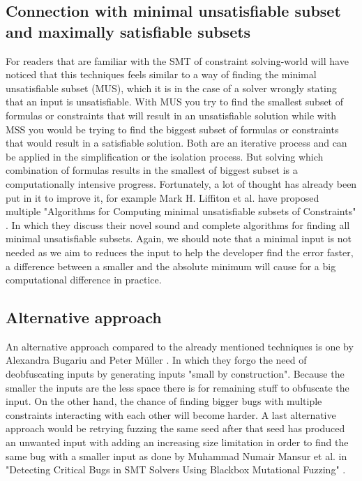 \subsection{Connection with minimal unsatisfiable subset and maximally satisfiable subsets}
\label{inputReduction:MUS/MSS}
For readers that are familiar with the SMT of constraint solving-world will have noticed that this techniques feels similar to a way of finding the minimal unsatisfiable subset (MUS), which it is in the case of a solver wrongly stating that an input is unsatisfiable. 
With MUS you try to find the smallest subset of formulas or constraints that will result in an unsatisfiable solution while with 
MSS you would be trying to find the biggest subset of formulas or constraints that would result in a satisfiable solution. Both are an iterative process and can be applied in the simplification or the isolation process. But solving which combination of formulas results in the smallest of biggest subset is a computationally intensive progress. Fortunately, a lot of thought has already been put in it to improve it, for example Mark H. Liffiton et al. have proposed multiple "Algorithms for Computing minimal unsatisfiable subsets of Constraints" \cite{51liffiton2008algorithms}. In which they discuss their novel sound and complete algorithms for finding all minimal unsatisfiable subsets. Again, we should note that a minimal input is not needed as we aim to reduces the input to help the developer find the error faster, a difference between a smaller and the absolute minimum will cause for a big computational difference in practice.

\subsection{Alternative approach}
\label{inputReduction:alt2deobfuscating}
An alternative approach compared to the already mentioned techniques is one by Alexandra Bugariu and Peter M\"uller \cite{9bugariu2020automaticallyTestingStringSolvers}. In which they forgo the need of deobfuscating inputs by generating inputs "small by construction". 
Because the smaller the inputs are the less space there is for remaining stuff to obfuscate the input. On the other hand, the chance of finding bigger bugs with multiple constraints interacting with each other will become harder.
A last alternative approach would be retrying fuzzing the same seed after that seed has produced an unwanted input with adding an increasing size limitation in order to find the same bug with a smaller input as done by Muhammad Numair Mansur et al. in "Detecting Critical Bugs in SMT Solvers Using Blackbox Mutational Fuzzing" \cite{1mansur2020detecting}.


